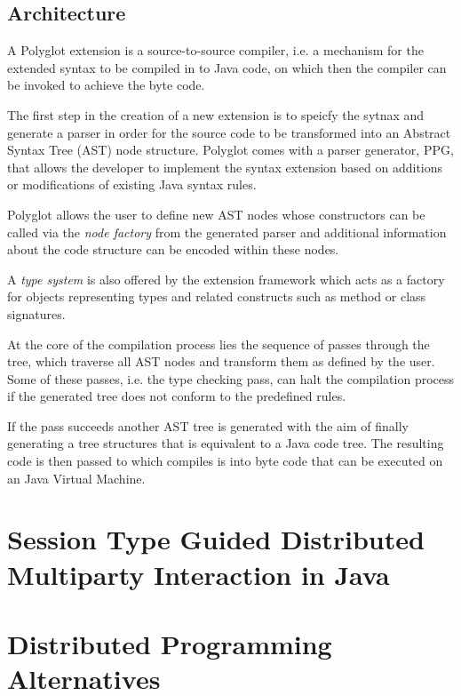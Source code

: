 \subsection{Architecture}
\label{subsec:polyglotarch}
A Polyglot extension is a source-to-source compiler, i.e. a mechanism for the extended syntax to be compiled in to Java code, on which then the  compiler can be invoked to achieve the byte code. 

The first step in the creation of a new extension is to speicfy the sytnax and generate a parser in order for the source code to be transformed into an Abstract Syntax Tree (AST) node structure. Polyglot comes with a parser generator, PPG, that allows the developer to implement the syntax extension based on additions or modifications of existing Java syntax rules\cite{polyglotpaper}.

Polyglot allows the user to define new AST nodes whose constructors can be called via the \textit{node factory} from the generated parser and additional information about the code structure can be encoded within these nodes. 

A \textit{type system} is also offered by the extension framework which acts as a factory for objects representing types and related constructs such as method or class signatures\cite{polyglotpaper}.

At the core of the compilation process lies the sequence of passes through the tree, which traverse all AST nodes and transform them as defined by the user. Some of these passes, i.e. the type checking pass, can halt the compilation process if the generated tree does not conform to the predefined rules. 

If the pass succeeds another AST tree is generated with the aim of finally generating a tree structures that is equivalent to a Java code tree. The resulting code is then passed to  which compiles is into byte code that can be executed on an Java Virtual Machine.



	
\section{Session Type Guided Distributed Multiparty Interaction in Java}
\label{sec:mpstjava}
	
	
\section{Distributed Programming Alternatives}
\label{sec:alternatives}
	


